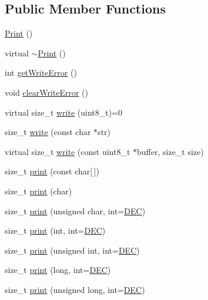 \subsection*{Public Member Functions}
\begin{DoxyCompactItemize}
\item 
\hyperlink{class_print_a1b9fe938883bb7b4bce8fba012dab112}{Print} ()
\item 
virtual \hyperlink{class_print_abc6ea5fd3d477d9465a57421ccd00ba4}{$\sim$\+Print} ()
\item 
int \hyperlink{class_print_a88a4a829fb5d589efb43955ad0cbddcc}{get\+Write\+Error} ()
\item 
void \hyperlink{class_print_aec9ecf84cc6d9087a650def3cefc459e}{clear\+Write\+Error} ()
\item 
virtual size\+\_\+t \hyperlink{class_print_a5be30d49adae2406a270c29ba9a3e0a3}{write} (uint8\+\_\+t)=0
\item 
size\+\_\+t \hyperlink{class_print_a5b40e0e9cab1f2fe5bb0cb22ffe5adda}{write} (const char $\ast$str)
\item 
virtual size\+\_\+t \hyperlink{class_print_ad98d820df11e2697be1e4b1ea30b4a23}{write} (const uint8\+\_\+t $\ast$buffer, size\+\_\+t size)
\item 
size\+\_\+t \hyperlink{class_print_acfe80773011eb17dfb52c2fba517a093}{print} (const char\mbox{[}$\,$\mbox{]})
\item 
size\+\_\+t \hyperlink{class_print_a1e411d07a8ffec5faf7ce485bac0f029}{print} (char)
\item 
size\+\_\+t \hyperlink{class_print_a97bd44df9222fa4a51a1266fab8d3bc1}{print} (unsigned char, int=\hyperlink{docs_2src_2spark__wiring__print_8h_a26e216c38cffa0a9965fa7933ba558b1}{D\+EC})
\item 
size\+\_\+t \hyperlink{class_print_a32cb3cf32d701c797b2b2d1080052dfe}{print} (int, int=\hyperlink{docs_2src_2spark__wiring__print_8h_a26e216c38cffa0a9965fa7933ba558b1}{D\+EC})
\item 
size\+\_\+t \hyperlink{class_print_a87275de35583868a370f43ce1c887750}{print} (unsigned int, int=\hyperlink{docs_2src_2spark__wiring__print_8h_a26e216c38cffa0a9965fa7933ba558b1}{D\+EC})
\item 
size\+\_\+t \hyperlink{class_print_ab1fb2a2384c7b9f628943f5046e7d1c1}{print} (long, int=\hyperlink{docs_2src_2spark__wiring__print_8h_a26e216c38cffa0a9965fa7933ba558b1}{D\+EC})
\item 
size\+\_\+t \hyperlink{class_print_a26a40be7a557c0bc391a15dce9f06954}{print} (unsigned long, int=\hyperlink{docs_2src_2spark__wiring__print_8h_a26e216c38cffa0a9965fa7933ba558b1}{D\+EC})

\end{DoxyCompactItemize}
